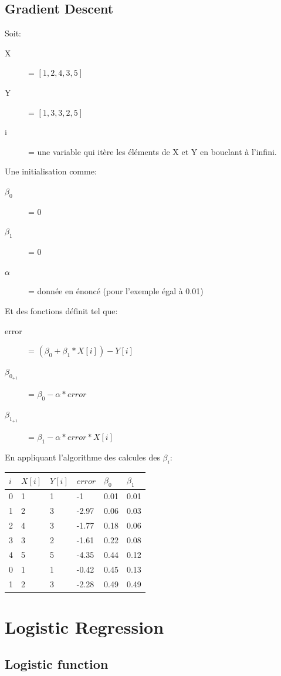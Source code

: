 \section{Gradient Descent}
Soit:
\begin{description}
\item[X] = $[1,2,4,3,5]$
\item[Y] = $[1,3,3,2,5]$
\item[i] = une variable qui itère les éléments de X et Y en bouclant à l'infini.
\end{description}
Une initialisation comme:
\begin{description}
\item[$\beta_0$] = 0
\item[$\beta_1$] = 0
\item[$\alpha$] = donnée en énoncé (pour l'exemple égal à 0.01)
\end{description}
Et des fonctions définit tel que:
\begin{description}
\item[error] = $(\beta_0 + \beta_1 * X[i]) - Y[i]$
\item[$\beta_{0_{+1}}$] = $\beta_0 - \alpha * error$
\item[$\beta_{1_{+1}}$] = $\beta_1 - \alpha * error * X[i]$
\end{description}

En appliquant l'algorithme des calcules des $\beta_i$:\\
\begin{tabular}{l|l|l|l|l|l}
  \hline
  $ i $ & $ X[i] $ &  $Y[i] $ &  $error $ & $ \beta_0 $ & $ \beta_1 $\\
  \hline
  0 & 1 & 1 & -1 & 0.01 & 0.01 \\
  1 & 2 & 3 & -2.97 & 0.06 & 0.03\\
  2 & 4 & 3 & -1.77 & 0.18 & 0.06\\
  3 & 3 & 2 & -1.61 & 0.22 & 0.08\\
  4 & 5 & 5 & -4.35 & 0.44 & 0.12\\
  0 & 1 & 1 & -0.42 & 0.45 & 0.13\\
  1 & 2 & 3 & -2.28 & 0.49 & 0.49\\
  \hline
\end{tabular}
\pagebreak
\chapter{Logistic Regression}
\section{Logistic function}

